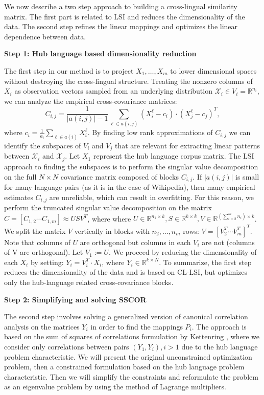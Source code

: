 \documentclass[twoside,11pt]{article}
\newcommand{\RR}{\mathbb{R}}
\begin{document}
We now describe a two step approach to building a cross-lingual similarity matrix. The first part is related to LSI and reduces the dimensionality of the data. The second step refines the linear mappings and optimizes the linear dependence between data.

\textbf{Step 1: Hub language based dimensionality reduction}

The first step in our method is to project $X_1, \ldots, X_m$ to lower dimensional spaces without destroying the cross-lingual structure. Treating the nonzero columns of $X_i$ as observation vectors sampled from an underlying distribution $\mathcal{X}_i \in V_i = \RR^{n_i}$, we can analyze the empirical cross-covariance matrices:
$$C_{i,j} = \frac{1}{|a(i,j)|-1 }\sum_{\ell \in a(i,j)} (X_i^{\ell} - c_i)\cdot (X_j^{\ell} - c_j)^T,$$
 where $c_i = \frac{1}{a_i} \sum_{\ell \in a(i)}X_i^{\ell}$. By finding low rank approximations of $C_{i,j}$ we can identify the subspaces of $V_i$ and $V_j$ that are relevant for extracting linear patterns between $\mathcal{X}_i$ and $\mathcal{X}_j$. Let $X_1$ represent the hub language corpus matrix. The LSI approach to finding the subspaces is to perform the singular value decomposition on the full $N \times N$ covariance matrix composed of blocks $C_{i,j}$. If $|a(i,j)|$ is small for many language pairs (as it is in the case of Wikipedia), then many empirical estimates $C_{i,j}$ are unreliable, which can result in overfitting. For this reason, we perform the truncated singular value decomposition on the matrix $C = [C_{1,2}  \cdots  C_{1,m}] \approx U S V^T$, where where $U \in \RR^{n_1 \times k}, S \in \RR^{k \times k}, V \in \RR^{(\sum_{i=2}^m n_i) \times k}$. We split the matrix $V$ vertically in blocks with $n_2, \ldots, n_m$ rows: $V = [V_2^T  \cdots  V_m^T]^T$. Note that columns of $U$ are orthogonal but columns in each $V_i$ are not (columns of V are orthogonal). Let $V_1 := U$. We proceed by reducing the dimensionality of each $X_i$ by setting: $Y_i = V_i^T \cdot X_i$, where $Y_i \in \RR^{k\times N}$. To summarize, the first step reduces the dimensionality of the data and is based on CL-LSI, but optimizes only the hub-language related cross-covariance blocks.

\textbf{Step 2: Simplifying and solving SSCOR}

The second step involves solving a generalized version of canonical correlation analysis on the matrices $Y_i$ in order to find the mappings $P_i$. The approach is based on the sum of squares of correlations formulation by Kettenring \cite{Kettenring}, where we consider only correlations between pairs $(Y_1, Y_i), i >1$ due to the hub language problem characteristic.
We will present the original unconstrained optimization problem, then a constrained formulation based on the hub language problem characteristic. Then we will simplify the constraints and reformulate
the problem as an eigenvalue problem by using the method of Lagrange multipliers.
\end{document}
